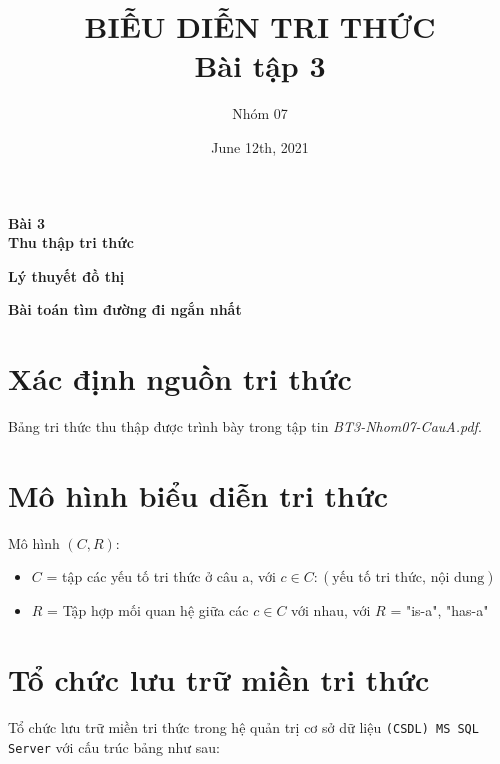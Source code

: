 \documentclass[a4paper]{article}
\title{BIỄU DIỄN TRI THỨC\\ Bài tập 3}
\author{Nhóm 07}
\date{June 12th, 2021}
\begin{document}
	\maketitle
	\begin{center}
		\LARGE{\textbf{Bài 3\\Thu thập tri thức}}
		
		\Large{\textbf{Lý thuyết đồ thị}}
		
		\Large{\textbf{Bài toán tìm đường đi ngắn nhất}}
	\end{center}
	
	\section{Xác định nguồn tri thức} 
	
	Bảng tri thức thu thập được trình bày trong tập tin \textit{BT3-Nhom07-CauA.pdf}.
	
	\section{Mô hình biểu diễn tri thức} 
	Mô hình $(C, R)$:
	
	\begin{itemize}
		\item $C$ =  tập các yếu tố tri thức ở câu a,
		với $c \in C: (\text{yếu tố tri thức, nội dung})$
		
		\item $R$ = Tập hợp mối quan hệ giữa các $c \in C$ với nhau, 
		với $R$ = {"is-a", "has-a"}
	\end{itemize}
	
	\section{Tổ chức lưu trữ miền tri thức} 
	
	Tổ chức lưu trữ miền tri thức trong hệ quản trị cơ sở dữ liệu \texttt{(CSDL) MS SQL Server} với cấu trúc bảng như sau:
	
\end{document}
